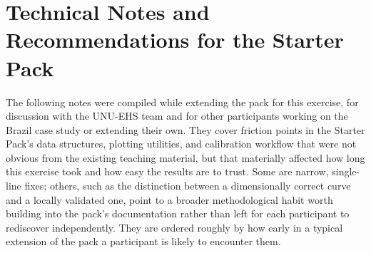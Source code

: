 \documentclass[11pt]{article}
\begin{document}



\appendix

\section{Technical Notes and Recommendations for the Starter Pack}
\label{app:notes}

The following notes were compiled while extending the pack for this exercise, for
discussion with the UNU-EHS team and for other participants working on the Brazil case
study or extending their own. They cover friction points in the Starter Pack's data
structures, plotting utilities, and calibration workflow that were not obvious from the
existing teaching material, but that materially affected how long this exercise took and
how easy the results are to trust. Some are narrow, single-line fixes; others, such as the
distinction between a dimensionally correct curve and a locally validated one, point to a
broader methodological habit worth building into the pack's documentation rather than
left for each participant to rediscover independently. They are ordered roughly by how
early in a typical extension of the pack a participant is likely to encounter them.
\end{document}
